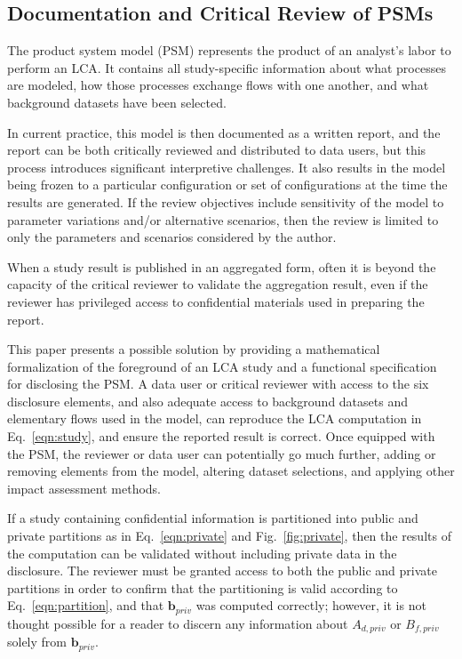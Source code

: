 \subsection{Documentation and Critical Review of PSMs}

The product system model (PSM) represents the product of an analyst's labor to perform an LCA.  It contains all study-specific information about what processes are modeled, how those processes exchange flows with one another, and what background datasets have been selected.

In current practice, this model is then documented as a written report, and the report can be both critically reviewed and distributed to data users, but this process introduces significant interpretive challenges.  It also results in the model being frozen to a particular configuration or set of configurations at the time the results are generated.  If the review objectives include sensitivity of the model to parameter variations and/or alternative scenarios, then the review is limited to only the parameters and scenarios considered by the author.

When a study result is published in an aggregated form, often it is beyond the capacity of the critical reviewer to validate the aggregation result, even if the reviewer has privileged access to confidential materials used in preparing the report. 

This paper presents a possible solution by providing a mathematical formalization of the foreground of an LCA study and a functional specification for disclosing the PSM.  A data user or critical reviewer with access to the six disclosure elements, and also adequate access to background datasets and elementary flows used in the model, can reproduce the LCA computation in Eq.~\ref{eqn:study}, and ensure the reported result is correct.  Once equipped with the PSM, the reviewer or data user can potentially go much further, adding or removing elements from the model, altering dataset selections, and applying other impact assessment methods.


If a study containing confidential information is partitioned into public and private partitions as in Eq.~\ref{eqn:private} and Fig.~\ref{fig:private}, then the results of the computation can be validated without including private data in the disclosure.  The reviewer must be granted access to both the public and private partitions in order to confirm that the partitioning is valid according to Eq.~\ref{eqn:partition}, and that $\mathbf{b}_{priv}$ was computed correctly; however, it is not thought possible for a reader to discern any information about $A_{d,priv}$ or $B_{f,priv}$ solely from $\mathbf{b}_{priv}$.

